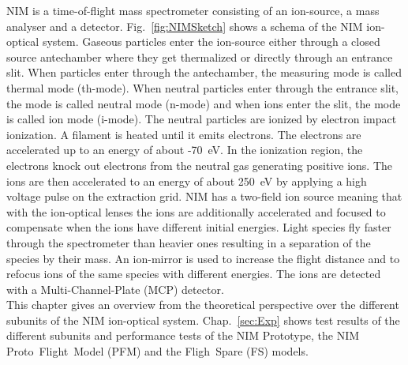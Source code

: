 	NIM is a time-of-flight mass spectrometer consisting of an ion-source, a mass analyser and a detector. Fig.~\ref{fig:NIMSketch} shows a schema of the NIM ion-optical system. Gaseous particles enter the ion-source either through a closed source antechamber where they get thermalized or directly through an entrance slit. When particles enter through the antechamber, the measuring mode is called thermal mode (th-mode). When neutral particles enter through the entrance slit, the mode is called neutral mode (n-mode) and when ions enter the slit, the mode is called ion mode (i-mode). The neutral particles are ionized by electron impact ionization. A filament is heated until it emits electrons. The electrons are accelerated up to an energy of about -70~eV. In the ionization region, the electrons knock out electrons from the neutral gas generating positive ions. The ions are then accelerated to an energy of about 250~eV by applying a high voltage pulse on the extraction grid. NIM has a two-field ion source meaning that with the ion-optical lenses the ions are additionally accelerated and focused to compensate when the ions have different initial energies. Light species fly faster through the spectrometer than heavier ones resulting in a separation of the species by their mass. An ion-mirror is used to increase the flight distance and to refocus ions of the same species with different energies. The ions are detected with a Multi-Channel-Plate (MCP) detector.\\
	This chapter gives an overview from the theoretical perspective over the different subunits of the NIM ion-optical system.	Chap.~\ref{sec:Exp} shows test results of the different subunits and performance tests of the NIM Prototype, the NIM Proto~Flight~Model (PFM) and the Fligh~Spare (FS) models.
	
